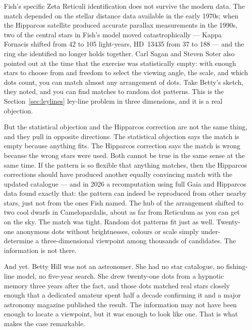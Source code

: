 Fish's specific Zeta Reticuli identification does not survive the modern data. The match
depended on the stellar distance data available in the early 1970s; when the Hipparcos
satellite produced accurate parallax measurements in the 1990s, two of the central stars in
Fish's model moved catastrophically --- Kappa Fornacis shifted from 42 to 105 light-years,
HD~13435 from 37 to 188 --- and the ring she identified no longer holds together. Carl
Sagan and Steven Soter also pointed out at the time that the exercise was statistically
empty: with enough stars to choose from and freedom to select the viewing angle, the scale,
and which dots count, you can match almost any arrangement of dots. Take Betty's sketch,
they noted, and you can find matches to random dot patterns. This is the
Section~\ref{sec:leylines} ley-line problem in three dimensions, and it is a real
objection.

But the statistical objection and the Hipparcos correction are not the same thing, and
they pull in opposite directions. The statistical objection says the match is empty
because anything fits. The Hipparcos correction says the match is wrong because the wrong
stars were used. Both cannot be true in the same sense at the same time. If the pattern is
so flexible that anything matches, then the Hipparcos corrections should have produced
another equally convincing match with the updated catalogue --- and in 2026 a recomputation
using full Gaia and Hipparcos data found exactly that: the pattern can indeed be reproduced
from other nearby stars, just not from the ones Fish named. The hub of the arrangement
shifted to two cool dwarfs in Camelopardalis, about as far from Reticulum as you can get on
the sky. The match was tight. Random dot patterns fit just as well. Twenty-one anonymous dots
without brightnesses, colours or scale simply under-determine a three-dimensional viewpoint
among thousands of candidates. The information is not there.

And yet. Betty Hill was not an astronomer. She had no star catalogue, no fishing-line model,
no five-year search. She drew twenty-one dots from a hypnotic memory three years after the
fact, and those dots matched real stars closely enough that a dedicated amateur spent half a
decade confirming it and a major astronomy magazine published the result. The information
may not have been enough to locate a viewpoint, but it was enough to look like one. That is
what makes the case remarkable.


